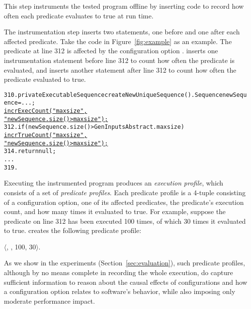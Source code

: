 This step instruments the tested program offline
by inserting code to record how often each predicate evaluates to true
at run time.


The instrumentation step inserts two statements, one
before and one after each affected predicate. Take
the code in Figure~\ref{fig:example} as an example.
The predicate at line 312 is affected by
the configuration option . \ourtool inserts
one instrumentation statement before line 312 to
count how often the predicate is evaluated, and
inserts another statement after line 312 to count how often
the predicate evaluated to true.

\vspace{-1mm}

\begin{CodeOut}
\begin{alltt}
310. private ExecutableSequence createNewUniqueSequence() .   Sequence newSequence = ...; 
       \underline{incrExecCount("maxsize",}
                     \underline{"newSequence.size() > maxsize");}
312.   if (newSequence.size() > GenInputsAbstract.maxsize) \ttlcb
         \underline{incrTrueCount("maxsize",}
                       \underline{"newSequence.size() > maxsize");}
314.     return null;
      ...
319. \ttrcb
\end{alltt}
\end{CodeOut}

\vspace{-1mm}

Executing the instrumented program produces an \textit{execution profile}, which
consists of a set of \textit{predicate profiles}.
Each predicate profile is a 4-tuple consisting of a configuration option,
one of its affected predicates, the predicate's execution count, and how
many times it evaluated to true. For example,
suppose the predicate on line 312 has been executed 100 times, of which
30 times it evaluated to true. \ourtool creates the following predicate
profile:

\noindent $\langle$, , 100, 30$\rangle$.

\vspace{1mm}


As we show in the experiments (Section~\ref{sec:evaluation}),
such predicate profiles, although by no means complete in
recording the whole execution, do capture
sufficient information to reason about the causal effects of configurations
and how a configuration option relates to software's behavior, while
also imposing only moderate performance impact.


